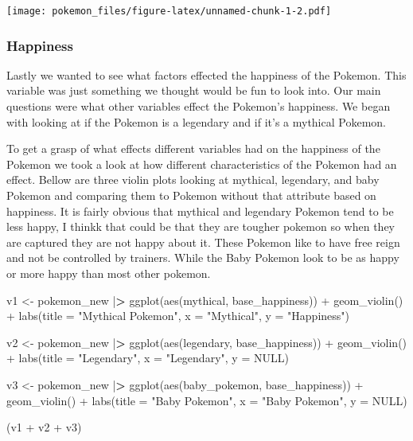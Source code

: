 \documentclass[
]{article}
\newenvironment{Shaded}{\begin{snugshade}}{\end{snugshade}}
\newcommand{\AttributeTok}[1]{\textcolor[rgb]{0.77,0.63,0.00}{#1}}
\newcommand{\ConstantTok}[1]{\textcolor[rgb]{0.00,0.00,0.00}{#1}}
\newcommand{\ErrorTok}[1]{\textcolor[rgb]{0.64,0.00,0.00}{\textbf{#1}}}
\newcommand{\FunctionTok}[1]{\textcolor[rgb]{0.00,0.00,0.00}{#1}}
\newcommand{\NormalTok}[1]{#1}
\newcommand{\OtherTok}[1]{\textcolor[rgb]{0.56,0.35,0.01}{#1}}
\newcommand{\SpecialCharTok}[1]{\textcolor[rgb]{0.00,0.00,0.00}{#1}}
\newcommand{\StringTok}[1]{\textcolor[rgb]{0.31,0.60,0.02}{#1}}
\begin{document}
\texttt{[image: pokemon\_files/figure-latex/unnamed-chunk-1-2.pdf]}

\hypertarget{happiness}{%
\subsubsection{Happiness}\label{happiness}}

Lastly we wanted to see what factors effected the happiness of the
Pokemon. This variable was just something we thought would be fun to
look into. Our main questions were what other variables effect the
Pokemon's happiness. We began with looking at if the Pokemon is a
legendary and if it's a mythical Pokemon.

To get a grasp of what effects different variables had on the happiness
of the Pokemon we took a look at how different characteristics of the
Pokemon had an effect. Bellow are three violin plots looking at
mythical, legendary, and baby Pokemon and comparing them to Pokemon
without that attribute based on happiness. It is fairly obvious that
mythical and legendary Pokemon tend to be less happy, I thinkk that
could be that they are tougher pokemon so when they are captured they
are not happy about it. These Pokemon like to have free reign and not be
controlled by trainers. While the Baby Pokemon look to be as happy or
more happy than most other pokemon.

\begin{Shaded}
\begin{Highlighting}[]
\NormalTok{v1 }\OtherTok{\textless{}{-}}\NormalTok{ pokemon\_new }\SpecialCharTok{|}\ErrorTok{\textgreater{}} \FunctionTok{ggplot}\NormalTok{(}\FunctionTok{aes}\NormalTok{(mythical, base\_happiness)) }\SpecialCharTok{+}
  \FunctionTok{geom\_violin}\NormalTok{() }\SpecialCharTok{+}
  \FunctionTok{labs}\NormalTok{(}\AttributeTok{title =} \StringTok{"Mythical Pokemon"}\NormalTok{, }\AttributeTok{x =} \StringTok{"Mythical"}\NormalTok{, }\AttributeTok{y =} \StringTok{"Happiness"}\NormalTok{)}

\NormalTok{v2 }\OtherTok{\textless{}{-}}\NormalTok{ pokemon\_new }\SpecialCharTok{|}\ErrorTok{\textgreater{}} \FunctionTok{ggplot}\NormalTok{(}\FunctionTok{aes}\NormalTok{(legendary, base\_happiness)) }\SpecialCharTok{+}
  \FunctionTok{geom\_violin}\NormalTok{() }\SpecialCharTok{+}
  \FunctionTok{labs}\NormalTok{(}\AttributeTok{title =} \StringTok{"Legendary"}\NormalTok{, }\AttributeTok{x =} \StringTok{"Legendary"}\NormalTok{, }\AttributeTok{y =} \ConstantTok{NULL}\NormalTok{)}

\NormalTok{v3 }\OtherTok{\textless{}{-}}\NormalTok{ pokemon\_new }\SpecialCharTok{|}\ErrorTok{\textgreater{}} \FunctionTok{ggplot}\NormalTok{(}\FunctionTok{aes}\NormalTok{(baby\_pokemon, base\_happiness)) }\SpecialCharTok{+}
  \FunctionTok{geom\_violin}\NormalTok{() }\SpecialCharTok{+}
  \FunctionTok{labs}\NormalTok{(}\AttributeTok{title =} \StringTok{"Baby Pokemon"}\NormalTok{, }\AttributeTok{x =} \StringTok{"Baby Pokemon"}\NormalTok{, }\AttributeTok{y =} \ConstantTok{NULL}\NormalTok{)}

\NormalTok{(v1 }\SpecialCharTok{+}\NormalTok{ v2 }\SpecialCharTok{+}\NormalTok{ v3)}
\end{Highlighting}
\end{Shaded}
\end{document}
